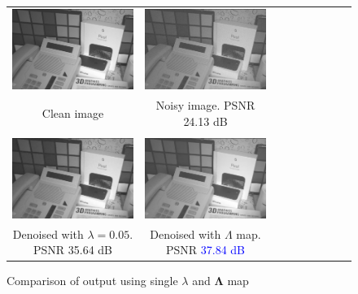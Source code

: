 \documentclass[12pt]{article}
\begin{document}
\begin{figure}[h]
\centering
\begin{tabular}{ c c c c c c c c c }
 \includegraphics[width=0.4\linewidth]{images/cur/image_clean.png}  & \includegraphics[width=0.4\linewidth]{images/cur/image_noisy.png} \\
 Clean image & Noisy image. PSNR 24.13 dB \\
   &  \\
 \includegraphics[width=0.4\linewidth]{images/cur/image_denoised_single_lambda.png} & \includegraphics[width=0.4\linewidth]{images/cur/image_denoised_lambda_map.png}   \\
 Denoised with $\lambda = 0.05$. PSNR 35.64 dB & Denoised with $\Lambda$ map. PSNR 
 \textcolor{blue}{37.84 dB}  \\

 
\end{tabular}

    \caption{Comparison of output using single $\lambda$ and $\mathbf{\Lambda}$ map}


\end{figure}
\end{document}
